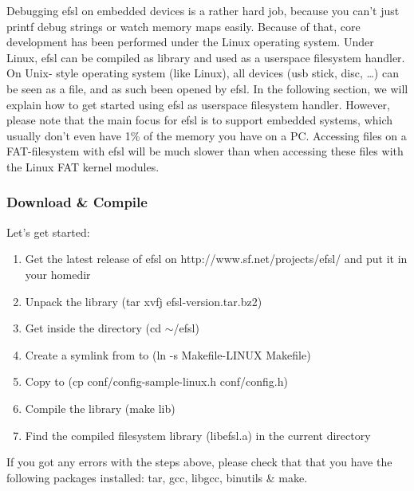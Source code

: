Debugging efsl on embedded devices is a rather hard job, because
you can't just printf debug strings or watch memory maps easily.
Because of that, core development has been performed under the
Linux operating system. Under Linux, efsl can be compiled as
library and used as a userspace filesystem handler. On Unix-
style operating system (like Linux), all devices (usb stick, disc, \ldots)
can be seen as a file, and as such been opened by efsl.\newline
\newline
In the following section, we will explain how to get started using
efsl as userspace filesystem handler. However, please note that the main
focus for efsl is to support embedded systems, which usually don't even
have 1\% of the memory you have on a PC. Accessing files on a FAT-filesystem
with efsl will be much slower than when accessing these files with the Linux
FAT kernel modules.
\subsubsection{Download \& Compile}
Let's get started:
\begin{enumerate}
	\item{Get the latest release of efsl on http://www.sf.net/projects/efsl/
		and put it in your homedir}
	\item{Unpack the library (tar xvfj efsl-version.tar.bz2)}
	\item{Get inside the directory (cd $\sim$/efsl)}
	\item{Create a symlink from  to 
		(ln -s Makefile-LINUX Makefile)}
	\item{Copy  to 
		(cp conf/config-sample-linux.h conf/config.h)}
	\item{Compile the library (make lib)}
	\item{Find the compiled filesystem library (libefsl.a) in the current
		directory}
\end{enumerate}
If you got any errors with the steps above, please check that that you have
the following packages installed: tar, gcc, libgcc, binutils \& make.
